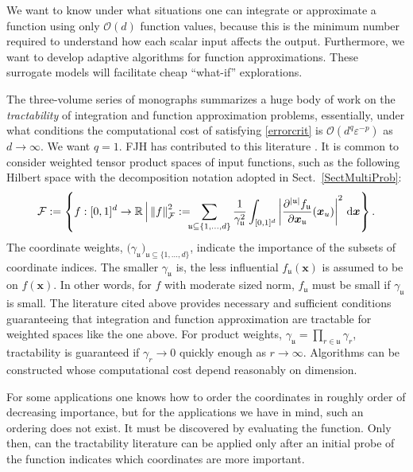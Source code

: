 \documentclass[11pt]{NSFamsart}
\newcommand{\reals}{{\mathbb{R}}}
\newcommand{\fu}{\mathfrak{u}}
\newcommand{\bx}{{\boldsymbol{x}}}
\def\dif{\textup{d}}
\newcommand{\calf}{{\mathcal{F}}}
\def\abs#1{\ensuremath{\left \lvert #1 \right \rvert}}
\newcommand{\norm}[2][{}]{\ensuremath{\left \lVert #2 \right \rVert}_{#1}}
\newcommand{\Order}{\mathcal{O}}
\begin{document}
We want to know under what situations one can integrate or approximate a function using only
$\Order(d)$ function values, because this is the minimum number required to understand how each 
scalar input affects the output.  Furthermore, we want to develop adaptive algorithms for function 
approximations.  These surrogate models will facilitate cheap ``what-if'' explorations. 

The three-volume series of monographs \cite{NovWoz08a,NovWoz10a,NovWoz12a} summarizes a 
huge body of work on the \emph{tractability} of integration and function approximation 
problems, essentially, under what conditions the computational cost of satisfying \eqref{errorcrit} is 
$\Order(d^q \varepsilon^{-p})$ as $d \to \infty$.  We want $q=1$.  FJH has contributed to this 
literature 
\cite{FasHicWoz12b,HicSloWas03a,HicSloWas03b,HicSloWas03c,HicSloWas03e,HicWasWoz06a,HicWoz00b,WanHic00b,YueHic04a,YueHic05a,ZhoHic15a}.
  It is 
common to consider weighted tensor product 
spaces of input functions, such as the following Hilbert space with the decomposition notation 
adopted 
in Sect.\ \ref{SectMultiProb}:
\begin{equation*}
\calf := \left\{ f : [0,1]^d \to \reals \, \Big \vert \norm[\calf]{f}^2 := \!\!\!\sum_{\fu \subseteq \{1, 
\ldots, d\}} 
\frac{1}{\gamma_{\fu}^2}\int_{[0,1]^d}\abs{\frac{\partial^{\abs{\fu}}f_{\fu}}{\partial \bx_\fu}(\bx_u)}^2 
\,  
\dif \bx
\right\}.
\end{equation*}
The coordinate weights, $\bigl(\gamma_{\fu} \bigr)_{\fu \subseteq \{1, \ldots, d\}}$, indicate the 
importance of the subsets of coordinate indices.  The smaller $\gamma_{\fu}$ is, the less influential 
$f_\fu(\bx)$ is assumed to be on $f(\bx)$.  In other words, for $f$ with moderate sized norm, 
$f_\fu$ 
must be small if $\gamma_{\fu}$ is small. The literature cited above provides necessary and 
sufficient conditions 
guaranteeing that integration and function approximation are tractable for weighted spaces like the 
one above.  For product weights, $\gamma_{\fu} = \prod_{r \in \fu} \gamma_r$, tractability is 
guaranteed  
if $\gamma_{r} \to 0$ quickly enough as $r \to \infty$.  Algorithms can be constructed whose 
computational cost depend reasonably on dimension.

For some applications one knows how to order the coordinates in roughly order of decreasing 
importance, but for the applications we have in mind, such an ordering does not exist.  It must be 
discovered by evaluating the function.  Only then, can the 
tractability literature can be applied only after an initial probe of the function indicates 
which coordinates are more important.
\end{document}
